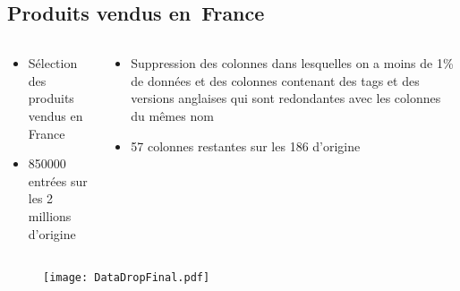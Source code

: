 \subsection{Produits vendus en France}
\begin{frame}{\insertsubsection}
  \begin{columns}[T]
    \begin{column}{.4\textwidth}
      \begin{itemize}
        \item Sélection des produits vendus en France
        \item \num{850000} entrées sur les 2 millions d'origine
      \end{itemize}
    \end{column}
    \begin{column}{.6\textwidth}
      \begin{itemize}
        \item Suppression des colonnes dans lesquelles on a moins de 1\% de données
              et des colonnes contenant des tags et des versions anglaises qui sont redondantes avec les
              colonnes du mêmes nom
        \item 57 colonnes restantes sur les 186 d'origine
      \end{itemize}
    \end{column}
  \end{columns}
  \vfill
  \begin{figure}
    \texttt{[image: DataDropFinal.pdf]}
  \end{figure}
\end{frame}

